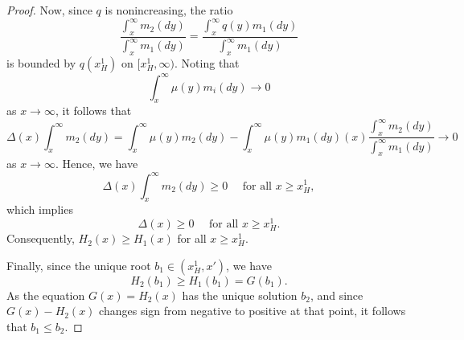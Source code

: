 \documentclass[10pt,a4paper]{amsart}
\begin{document}
\begin{proof}
    Now, since $q$ is nonincreasing, the ratio 
    \begin{equation*}
        \frac{\int_x^\infty m_{2}(dy)}{\int_x^\infty m_{1}(dy)}
        =\frac{\int_x^\infty q(y)m_{1}(dy)}{\int_x^\infty m_{1}(dy)}
    \end{equation*}
    is bounded by $q(x_H^1)$ on $[x_H^1, \infty)$. Noting that 
    \[\int_x^\infty \mu(y)m_{i}(dy) \to 0\] 
    as $x \to \infty$, it follows that
    \begin{equation*}
        \Delta(x)\int_x^\infty m_{2}(dy) = 
        \int_x^\infty \mu(y)m_{2}(dy)-\int_x^\infty \mu(y)m_{1}(dy)(x)\frac{\int_x^\infty m_{2}(dy)}{\int_x^\infty m_{1}(dy)} \to 0
    \end{equation*}
    as $x \to \infty$. Hence, we have 
    \begin{equation*}
        \Delta(x) \int_x^\infty m_{2}(dy) \geq 0 \quad \text{ for all } x \geq x_H^1,
    \end{equation*}
    which implies
    \begin{equation*}
        \Delta(x) \geq 0 \quad \text{ for all } x \geq x_H^1.
    \end{equation*}
    Consequently, $H_2(x) \geq H_1(x)$ for all $ x \geq x_H^1$.
    
    Finally, since the unique root $b_1 \in (x_H^1,x')$, we have 
    \begin{equation*}
        H_2(b_1) \geq H_1(b_1) = G(b_1).
    \end{equation*}
    As the equation $G(x) = H_2(x)$ has the unique solution $b_2$, and since $G(x)-H_2(x)$ changes sign from negative to positive at that point, it follows that $b_1 \le b_2.$
\end{proof}
\end{document}
